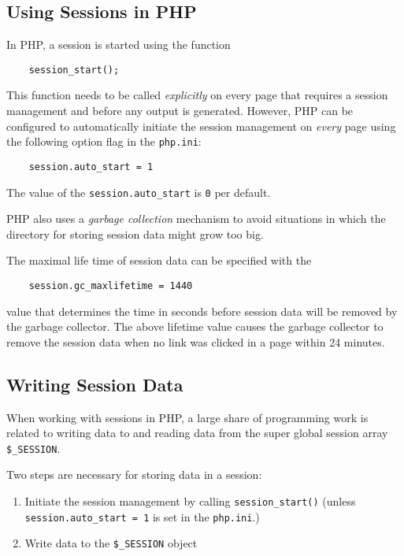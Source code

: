 \documentclass[a4paper, justified, notoc]{tufte-handout} %
\begin{document}
\subsection{Using Sessions in PHP} %
\label{sub:using_sessions_in_php}
In PHP, a session is started using the function
\begin{Verbatim}
  	session_start();
\end{Verbatim}  
This function needs to be called \emph{explicitly} on every page that requires a session management and before any output is generated.
However, PHP can be configured to automatically initiate the session management on \emph{every} page using the following option flag in the \texttt{php.ini}:
\begin{Verbatim}
	session.auto_start = 1
\end{Verbatim} 
The value of the \texttt{session.auto\_start} is \texttt{0} per default. 

PHP also uses a \emph{garbage collection} mechanism to avoid situations in which the directory for storing session data might grow too big. 

The maximal life time of session data can be specified with the 
\begin{Verbatim}
	session.gc_maxlifetime = 1440 
\end{Verbatim}
value that determines the time in seconds before session data will be removed by the garbage collector. 
The above lifetime value causes the garbage collector to remove the session data when no link was clicked in a page within 24 minutes.   

\subsection{Writing Session Data} %
\label{sub:writing_session_data}
When working with sessions in PHP, a large share of programming work is related to writing data to and reading data from the super global session array \texttt{\$\_SESSION}.

Two steps are necessary for storing data in a session:
\begin{enumerate}
	\item Initiate the session management by calling \texttt{session\_start()} \newline (unless \texttt{session.auto\_start = 1} is set in the \texttt{php.ini}.)
	\item Write data to the \texttt{\$\_SESSION} object
\end{enumerate}
\end{document}
